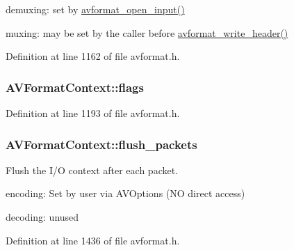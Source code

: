 \begin{DoxyItemize}
\item demuxing\+: set by \hyperlink{group__lavf__decoding_ga10a404346c646e4ab58f4ed798baca32}{avformat\+\_\+open\+\_\+input()}
\item muxing\+: may be set by the caller before \hyperlink{group__lavf__encoding_ga78d4e734fecb1d2385536e6dd5b7b9f5}{avformat\+\_\+write\+\_\+header()} 
\end{DoxyItemize}

Definition at line 1162 of file avformat.\+h.

\subsubsection[{\texorpdfstring{flags}{flags}}]{ A\+V\+Format\+Context\+::flags}\hypertarget{struct_a_v_format_context_a32379cc371463b235d54235d4af06a15}{}\label{struct_a_v_format_context_a32379cc371463b235d54235d4af06a15}


Definition at line 1193 of file avformat.\+h.

\subsubsection[{\texorpdfstring{flush\+\_\+packets}{flush_packets}}]{ A\+V\+Format\+Context\+::flush\+\_\+packets}\hypertarget{struct_a_v_format_context_a1fdd77fff4c7df1e30ce1d42e10922e9}{}\label{struct_a_v_format_context_a1fdd77fff4c7df1e30ce1d42e10922e9}
Flush the I/O context after each packet.
\begin{DoxyItemize}
\item encoding\+: Set by user via A\+V\+Options (NO direct access)
\item decoding\+: unused 
\end{DoxyItemize}

Definition at line 1436 of file avformat.\+h.

